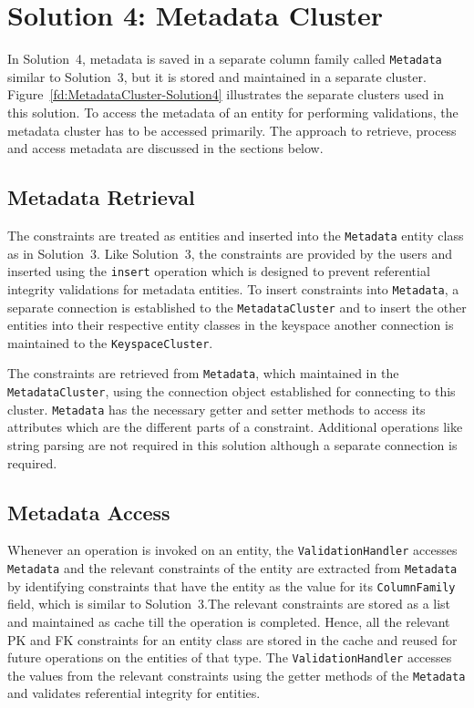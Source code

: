 \section{Solution 4:  Metadata Cluster}\label{s:Implementation-Solution4}
In Solution~4, metadata is saved in a separate column family called
\texttt{Metadata} similar to Solution~3, but it is stored and maintained in a
separate cluster. Figure~\ref{fd:MetadataCluster-Solution4} illustrates the
separate clusters used in this solution. To access the metadata of an entity for 
performing validations, the
metadata cluster has to be accessed primarily. The approach to retrieve, process
and access metadata are discussed in the sections below.

\subsection{Metadata Retrieval}
The constraints are treated as entities and inserted into the \texttt{Metadata}
entity class as in Solution~3. Like Solution~3, the constraints
are provided by the users and inserted using the \texttt{insert} operation which
is designed to prevent referential integrity validations for metadata entities.
 To insert constraints into \texttt{Metadata}, a separate
connection is established to the \texttt{MetadataCluster} and to insert the other entities
into their respective entity classes in the keyspace another connection is
maintained to the \texttt{KeyspaceCluster}.

The constraints are retrieved from  \texttt{Metadata}, which 
maintained in the \texttt{MetadataCluster}, using the connection object
established for connecting to this cluster.  \texttt{Metadata}
has the necessary getter and setter methods to access its attributes which are
the different parts of a constraint. Additional operations like string parsing
are not required in this solution although a separate connection is required.

\subsection{Metadata Access}

 
Whenever an operation is invoked on an entity, the \texttt{ValidationHandler}
accesses \texttt{Metadata} and the relevant constraints of the entity are
extracted from \texttt{Metadata} by identifying constraints that have  the entity as the value
for its \texttt{ColumnFamily} field, which is similar to Solution~3.The relevant constraints
are stored as a list and maintained as cache till the operation is completed.
Hence, all the relevant \ac{PK} and \ac{FK} constraints for an entity class are
stored in the cache and reused for future operations on the entities of that
type.%
The \texttt{ValidationHandler} accesses the values from the relevant constraints
using the getter methods of the \texttt{Metadata} and validates referential
integrity for entities.

